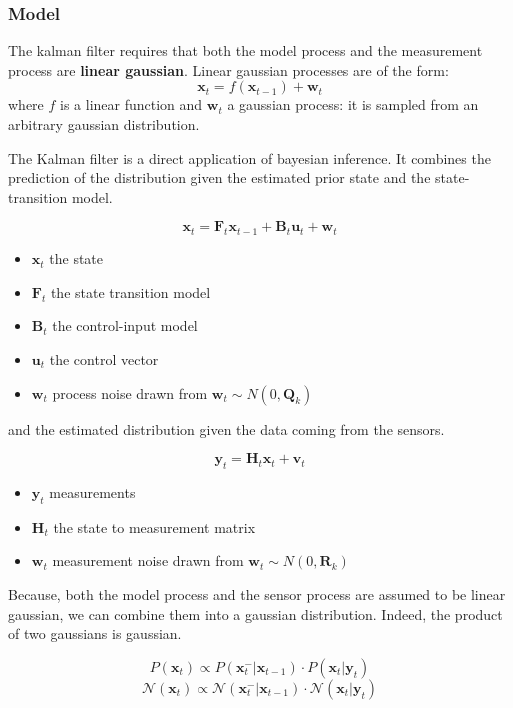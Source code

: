 \documentclass[12pt,]{article}
\providecommand{\tightlist}{%
  \setlength{\itemsep}{0pt}\setlength{\parskip}{0pt}}
\begin{document}
\subsubsection{Model}\label{model-1}

The kalman filter requires that both the model process and the
measurement process are \textbf{linear gaussian}. Linear gaussian
processes are of the form:
\[\mathbf{x}_t = f(\mathbf{x}_{t-1}) + \mathbf{w}_t\] where \(f\) is a
linear function and \(\mathbf{w}_t\) a gaussian process: it is sampled
from an arbitrary gaussian distribution.

The Kalman filter is a direct application of bayesian inference. It
combines the prediction of the distribution given the estimated prior
state and the state-transition model.

\[\mathbf{x}_t = \mathbf{F}_t \mathbf{x}_{t-1} + \mathbf{B}_t \mathbf{u}_t + \mathbf{w}_t \]

\begin{itemize}
\tightlist
\item
  \(\mathbf{x}_t\) the state
\item
  \(\mathbf{F}_t\) the state transition model
\item
  \(\mathbf{B}_t\) the control-input model
\item
  \(\mathbf{u}_t\) the control vector
\item
  \(\mathbf{w}_t\) process noise drawn from
  \(\mathbf{w}_t \sim N(0, \mathbf{Q}_k)\)
\end{itemize}

and the estimated distribution given the data coming from the sensors.

\[\mathbf{y}_t = \mathbf{H}_t \mathbf{x}_{t}  + \mathbf{v}_t \]

\begin{itemize}
\tightlist
\item
  \(\mathbf{y}_t\) measurements
\item
  \(\mathbf{H}_t\) the state to measurement matrix
\item
  \(\mathbf{w}_t\) measurement noise drawn from
  \(\mathbf{w}_t \sim N(0, \mathbf{R}_k)\)
\end{itemize}

Because, both the model process and the sensor process are assumed to be
linear gaussian, we can combine them into a gaussian distribution.
Indeed, the product of two gaussians is gaussian.

\[P(\mathbf{x}_{t}) \propto P(\mathbf{x}^{-}_{t}|\mathbf{x}_{t-1}) \cdot P(\mathbf{x}_t | \mathbf{y}_t )\]
\[\mathcal{N}(\mathbf{x}_{t}) \propto \mathcal{N}(\mathbf{x}^{-}_{t}|\mathbf{x}_{t-1}) \cdot \mathcal{N}(\mathbf{x}_t | \mathbf{y}_t )\]
\end{document}
